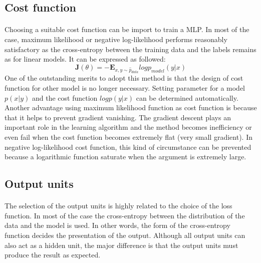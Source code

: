 \subsection{Cost function}
\paragraph{}
Choosing a suitable cost function can be import to train a MLP.
In most of the case, maximum likelihood or negative log-likelihood performs reasonably satisfactory as the cross-entropy between the training data and the labels remains as for linear models.
It can be expressed as followed:
\begin{equation}
    \mathbf{J}(\theta) = -\mathbf{E}_{x,y\sim \hat{p}_{data}}  log   p_{model} (y|x)
    \label{lr_eq:ml_MLE}
\end{equation}
%
One of the outstanding merits to adopt this method is that the design of cost function for other model is no longer necessary.
Setting parameter for a model $p(x|y)$ and the cost function $log p(y|x)$ can be determined automatically.
Another advantage using maximum likelihood function as cost function is because that it helps to prevent gradient vanishing.
The gradient descent plays an important role in the learning algorithm and the method becomes inefficiency or even fail when the cost function becomes extremely flat (very small gradient).
In negative log-likelihood cost function, this kind of circumstance can be prevented because a logarithmic function saturate when the argument is extremely large.

\subsection{Output units}
\paragraph{}
The selection of the output units is highly related to the choice of the loss function.
In most of the case the cross-entropy between the distribution of the data and the model is used.
In other words, the form of the cross-entropy function decides the presentation of the output.
Although all output units can also act as a hidden unit, the major difference is that the output units must produce the result as expected.
